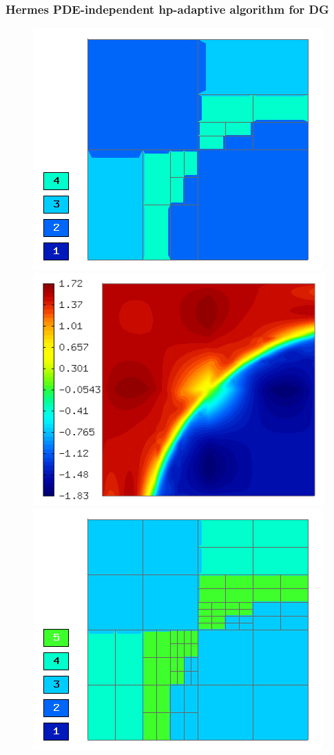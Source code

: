 \documentclass{beamer}
\begin{document}
\begin{frame}
\frametitle{Hermes PDE-independent hp-adaptive algorithm for DG}
\begin{center}
\vspace{0.86mm}
\begin{figure}[t]
\includegraphics[width=0.42\textheight]{refsln/screen005.png}
\includegraphics[width=0.42\textheight]{refsln/screen004.png}
\includegraphics[width=0.42\textheight]{refsln/screen006.png}

\end{figure}
\end{center}
\end{frame}
\end{document}
